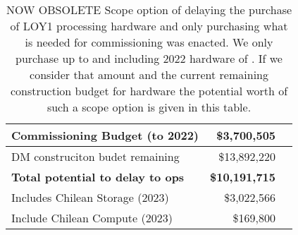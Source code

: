 \tiny \begin{longtable} { |p{}  |r  |r |} 
\caption{NOW OBSOLETE Scope option of delaying the purchase of LOY1 processing hardware and only purchasing what is needed for commissioning was enacted. We only purchase up to and including 2022 hardware of . If we consider that amount and the current remaining construction budget for hardware the potential worth of such a scope option is given in this table. \label{tab:Scope}}\\ 
\hline 
\textbf{Commissioning Budget (to 2022)  }&\textbf{\$3,700,505} \\ \hline
{DM construciton budet remaining}&{\$13,892,220} \\ \hline
\textbf{Total potential to delay to ops }&\textbf{\$10,191,715} \\ \hline
{Includes Chilean Storage (2023)}&{\$3,022,566} \\ \hline
{Include Chilean Compute (2023)}&{\$169,800} \\ \hline
\end{longtable} \normalsize
